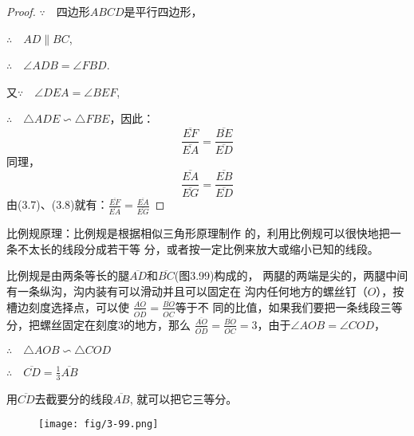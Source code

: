 \begin{proof}
$\because\quad $四边形$ABCD$是平行四边形，

$\therefore\quad AD\parallel BC$,

$\therefore\quad \angle ADB=\angle FBD$.

又$\because\quad \angle DEA=\angle BEF$,

$\therefore\quad \triangle ADE\backsim \triangle FBE$，因此：
\begin{equation}
    \frac{\overline{EF}}{\overline{EA}}=\frac{\overline{BE}}{\overline{ED}}
\end{equation}
同理，
\begin{equation}
    \frac{\overline{EA}}{\overline{EG}}=\frac{\overline{EB}}{\overline{ED}}
\end{equation}
由(3.7)、(3.8)就有：$\frac{\overline{EF}}{\overline{EA}}=\frac{\overline{EA}}{\overline{EG}}$
\end{proof}

\begin{example}
    比例规原理：比例规是根据相似三角形原理制作
的，利用比例规可以很快地把一条不太长的线段分成若干等
分，或者按一定比例来放大或缩小已知的线段。

比例规是由两条等长的腿$\overline{AD}$和$\overline{BC}$(图3.99)构成的，
两腿的两端是尖的，两腿中间有一条纵沟，沟内装有可以滑动并且可以固定在
沟内任何地方的螺丝钉（$O$），按槽边刻度选择点，可以使
$\frac{\overline{AO}}{\overline{OD}}=\frac{\overline{BO}}{\overline{OC}}$等于不
同的比值，如果我们要把一条线段三等
分，把螺丝固定在刻度3的地方，那么
$\frac{\overline{AO}}{\overline{OD}}=\frac{\overline{BO}}{\overline{OC}}=3$，由于$\angle AOB=\angle COD$，

$\therefore\quad \triangle AOB\backsim \triangle COD$

$\therefore\quad \overline{CD}=\frac{1}{3}\overline{AB}$

用$\overline{CD}$去截要分的线段$\overline{AB}$, 就可以把它三等分。
\end{example}

\begin{figure}[htp]\centering
    \begin{minipage}[t]{0.38\textwidth}
    \centering
\texttt{[image: fig/3-99.png]}
    \caption{}
    \end{minipage}
    \begin{minipage}[t]{0.58\textwidth}
    \centering
    \caption{}
    \end{minipage}
    \end{figure}


